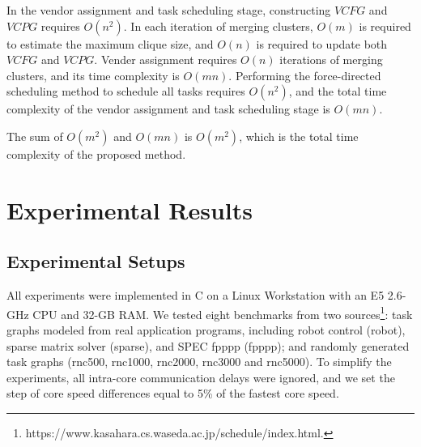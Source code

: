 \documentclass[10pt,journal, compsoc]{IEEEtran}
\begin{document}
In the vendor assignment and task scheduling stage, constructing $VCFG$ and $VCPG$ requires $O(n^2)$. In each iteration of merging clusters, $O(m)$ is required to estimate the maximum clique size, and $O(n)$ is required to update both $VCFG$ and $VCPG$. Vender assignment requires $O(n)$ iterations of merging clusters, and its time complexity is $O(mn)$. Performing the force-directed scheduling method to schedule all tasks requires $O(n^2)$, and the total time complexity of the vendor assignment and task scheduling stage is $O(mn)$.

The sum of $O(m^2)$ and $O(mn)$ is $O(m^2)$, which is the total time complexity of the proposed method.


\section{Experimental Results}

\subsection{Experimental Setups}
All experiments were implemented in C on a Linux Workstation with an E5 2.6-GHz CPU and 32-GB RAM. We tested eight benchmarks from two sources\footnote{https://www.kasahara.cs.waseda.ac.jp/schedule/index.html.}: task graphs modeled from real application programs, including robot control (robot), sparse matrix solver (sparse), and SPEC fpppp (fpppp); and randomly generated task graphs (rnc500, rnc1000, rnc2000, rnc3000 and rnc5000). To simplify the experiments, all intra-core communication delays were ignored, and we set the step of core speed differences equal to 5\% of the fastest core speed.
\end{document}

